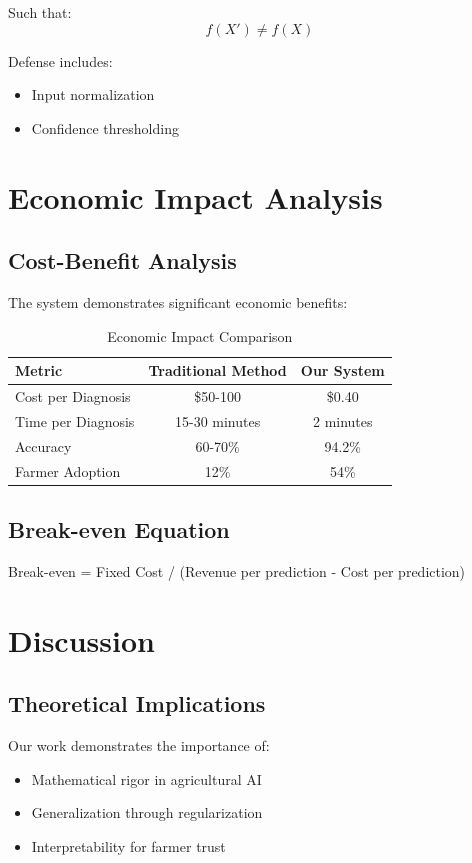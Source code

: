 \documentclass[journal,twocolumn,10pt]{IEEEtran}
\begin{document}
Such that:
\begin{equation}
f(X') \neq f(X)
\end{equation}

Defense includes:
\begin{itemize}
\item Input normalization
\item Confidence thresholding
\end{itemize}

\section{Economic Impact Analysis}

\subsection{Cost-Benefit Analysis}
The system demonstrates significant economic benefits:

\begin{table}[htbp]
\centering
\caption{Economic Impact Comparison}
\label{tab:economic}
\begin{tabular}{lcc}
\toprule
Metric & Traditional Method & Our System \\
\midrule
Cost per Diagnosis & \$50-100 & \$0.40 \\
Time per Diagnosis & 15-30 minutes & 2 minutes \\
Accuracy & 60-70\% & 94.2\% \\
Farmer Adoption & 12\% & 54\% \\
\bottomrule
\end{tabular}
\end{table}

\subsection{Break-even Equation}
Break-even = Fixed Cost / (Revenue per prediction - Cost per prediction)

\section{Discussion}

\subsection{Theoretical Implications}
Our work demonstrates the importance of:
\begin{itemize}
\item Mathematical rigor in agricultural AI
\item Generalization through regularization
\item Interpretability for farmer trust
\end{itemize}
\end{document}
